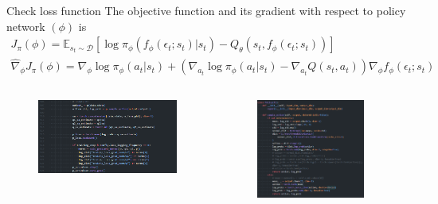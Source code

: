 \documentclass[8pt]{beamer}
\newcommand{\mbb}[1]{\mathbb{#1}}
\begin{document}
\begin{frame}{Check loss function}
    The objective function and its gradient with respect to policy network $(\phi)$ is
    \[
    \begin{gathered}
        J_\pi(\phi) = \mbb{E}_{s_t \sim \mathcal{D}} [\log{\pi_\phi (f_\phi (\epsilon_t;s_t)| s_t)} - Q_\theta (s_t, f_\phi (\epsilon_t; s_t))]\\
        \hat{\nabla}_\phi J_\pi (\phi) = \nabla_\phi \log{\pi_\phi (a_t|s_t)} + (\nabla_{a_t} \log{\pi_\phi (a_t|s_t)} - \nabla_{a_t} Q(s_t, a_t))\nabla_\phi f_\phi (\epsilon_t; s_t)
    \end{gathered}
    \]

    \begin{columns}[c]
        \begin{column}{0.5\textwidth}
            \begin{figure}
                \centering
                \includegraphics[width=1.0\textwidth]{fig7.png}
            \end{figure}
        \end{column}
        \begin{column}{0.5\textwidth}
            \begin{figure}
                \centering
                \includegraphics[width=0.9\textwidth]{fig8.png}
            \end{figure}
        \end{column}
    \end{columns}


\end{frame}
\end{document}
